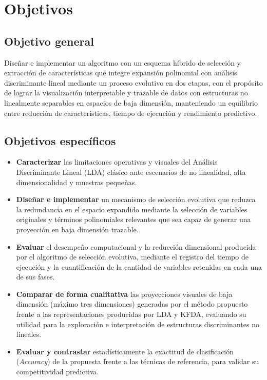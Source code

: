 \section{Objetivos}
\label{sec:Objetivo-General}

\subsection{Objetivo general}

Diseñar e implementar un algoritmo con un esquema híbrido de selección y extracción de características que integre expansión polinomial con análisis discriminante lineal mediante un proceso evolutivo en dos etapas, con el propósito de lograr la visualización interpretable y trazable de datos con estructuras no linealmente separables en espacios de baja dimensión, manteniendo un equilibrio entre reducción de características, tiempo de ejecución y rendimiento predictivo.

\subsection{Objetivos específicos}

\begin{itemize}
	
	\item \textbf{Caracterizar} las limitaciones operativas y visuales del Análisis Discriminante Lineal (LDA) clásico ante escenarios de no linealidad, alta dimensionalidad y muestras pequeñas.
	
	\item \textbf{Diseñar e implementar} un mecanismo de selección evolutiva que reduzca la redundancia en el espacio expandido mediante la selección de variables originales y términos polinomiales relevantes que sea capaz de generar una proyección en baja dimensión trazable.
	
	\item \textbf{Evaluar} el desempeño computacional y la reducción dimensional producida por el algoritmo de selección evolutiva, mediante el registro del tiempo de ejecución y la cuantificación de la cantidad de variables retenidas en cada una de sus fases.	
	
	\item \textbf{Comparar de forma cualitativa} las proyecciones visuales de baja dimensión (máximo tres dimensiones) generadas por el método propuesto frente a las representaciones producidas por LDA y KFDA, evaluando su utilidad para la exploración e interpretación de estructuras discriminantes no lineales.		
	
	\item \textbf{Evaluar y contrastar} estadísticamente la exactitud de clasificación (\textit{Accuracy}) de la propuesta frente a las técnicas de referencia, para validar su competitividad predictiva.
	
	
\end{itemize}


